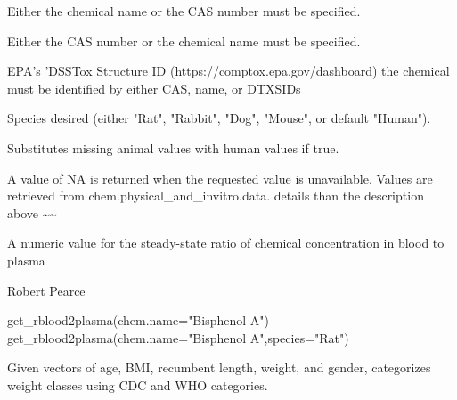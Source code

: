 \documentclass[a4paper]{book}
\begin{document}
\begin{Arguments}
\begin{ldescription}
\item[\code{chem.name}] Either the chemical name or the CAS number must be
specified.

\item[\code{chem.cas}] Either the CAS number or the chemical name must be
specified.

\item[\code{dtxsid}] EPA's 'DSSTox Structure ID (https://comptox.epa.gov/dashboard)
the chemical must be identified by either CAS, name, or DTXSIDs

\item[\code{species}] Species desired (either "Rat", "Rabbit", "Dog", "Mouse", or
default "Human").

\item[\code{default.to.human}] Substitutes missing animal values with human values
if true.
\end{ldescription}
\end{Arguments}
%
\begin{Details}\relax
A value of NA is returned when the requested value is unavailable.  Values
are retrieved from chem.physical\_and\_invitro.data. 
details than the description above \textasciitilde{}\textasciitilde{}
\end{Details}
%
\begin{Value}
A numeric value for the steady-state ratio of chemical concentration in blood
to plasma
\end{Value}
%
\begin{Author}\relax
Robert Pearce
\end{Author}
%
\begin{Examples}
\begin{ExampleCode}

get_rblood2plasma(chem.name="Bisphenol A")
get_rblood2plasma(chem.name="Bisphenol A",species="Rat")

\end{ExampleCode}
\end{Examples}
%
\begin{Description}\relax
Given vectors of age, BMI, recumbent length, weight, and gender,
categorizes weight classes using CDC and WHO categories.
\end{Description}
\end{document}
